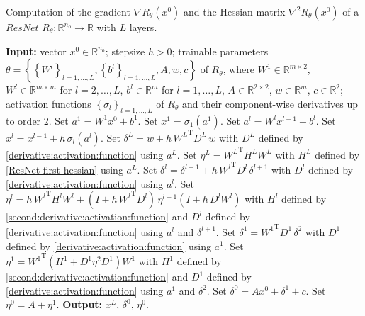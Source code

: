 \begin{algorithm}[H]
    \caption{Computation of the gradient $\nabla R_{\theta} \left( x^0 \right)$ and the Hessian matrix $\nabla^2 R_{\theta} \left( x^0 \right)$ of a $ResNet$ $R_{\theta} \colon \mathbb{R}^{n_0} \to \mathbb{R}$ with $L$ layers.} \label{Algorithm 2}
    \begin{algorithmic}[1]
        \State \textbf{Input:} vector $x^0 \in \mathbb{R}^{n_0}$; stepsize $h > 0$; trainable parameters $\theta = \left\{ \left\{ W^l \right\}_{l = 1, \ldots, L}, \left\{ b^l \right\}_{l = 1, \ldots, L}, A, w, c \right\}$ of $R_{\theta}$, where $W^1 \in \mathbb{R}^{m \times 2}$, $W^l \in \mathbb{R}^{m \times m}$ for $l = 2, \ldots, L$, $b^l \in \mathbb{R}^{m}$ for $l = 1, \ldots, L$, $A \in \mathbb{R}^{2 \times 2}$, $w \in \mathbb{R}^m$, $c \in \mathbb{R}^2$; activation functions $\left\{ \sigma_{l} \right\}_{l = 1, \ldots, L}$ of $R_{\theta}$ and their component-wise derivatives up to order $2$.
        \State Set $a^1 = W^1 x^{0} + b^1$.
        \State Set $x^1 = \sigma_1(a^1)$.
            \State Set $a^l = W^l x^{l-1} + b^l$.
            \State Set $x^l = x^{l-1} + h \, \sigma_l(a^l)$.
        \EndFor
        \State Set $\delta^{L} = w + h \, {W^{L}}^{\mathrm{T}} D^{L} \, w$ with $D^L$ defined by \cref{derivative:activation:function} using $a^L$.
        \State Set $\eta^{L} = {W^L}^{\mathrm{T}} H^L W^L$ with $H^L$ defined by \cref{ResNet first hessian} using $a^L$.
            \State Set $\delta^{l} = \delta^{l+1} + h \, {W^{l}}^{\mathrm{T}} D^{l} \, \delta^{l+1}$ with $D^l$ defined by \cref{derivative:activation:function} using $a^l$.
            \State Set $\eta^{l} = h \, {W^{l}}^{\mathrm{T}} H^{l} W^{l} + \left( I + h \, {W^{l}}^{\mathrm{T}} D^{l} \right) \, \eta^{l+1}  \left( I + h \,  D^{l} {W^{l}} \right)$
            \StatexIndent[1] with $H^l$ defined by \cref{second:derivative:activation:function} and $D^l$ defined by \cref{derivative:activation:function} 
            \StatexIndent[1] using $a^l$ and $\delta^{l+1}$.
        \EndFor
        \State Set $\delta^{1} = {W^{1}}^{\mathrm{T}} D^{1} \, \delta^{2}$ with $D^1$ defined by \cref{derivative:activation:function} using $a^1$.
        \State Set $\eta^{1} = {W^{1}}^{\mathrm{T}} \left( H^{1} + D^{1} \eta^{2} D^{1} \right) W^{1}$ with $H^1$ defined by \cref{second:derivative:activation:function} and 
        \StatexIndent[0] $D^1$ defined by \cref{derivative:activation:function} using $a^1$ and $\delta^{2}$.
        \State Set $\delta^{0} = A x^0 + \delta^{1} + c$.
        \State Set $\eta^{0} = A + \eta^{1}$.
        \State \textbf{Output:} $x^L$, $\delta^0$, $\eta^0$.
    \end{algorithmic}
\end{algorithm}

